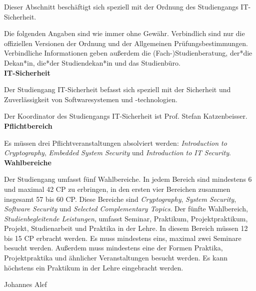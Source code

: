 {Dieser Abschnitt beschäftigt sich speziell mit der Ordnung des Studiengangs IT-Sicherheit.
}{
    Die folgenden Angaben sind wie immer ohne Gewähr. Verbindlich sind nur die offiziellen Versionen der Ordnung und der Allgemeinen Prüfungsbestimmungen. Verbindliche Informationen geben außerdem die (Fach-)Studienberatung, der*die Dekan*in, die*der Studiendekan*in und das Studienbüro.\\

    \noindent\textbf{IT-Sicherheit}

    Der Studiengang IT-Sicherheit befasst sich speziell mit der Sicherheit und Zuverlässigkeit von Softwaresystemen und -technologien.

    Der Koordinator des Studiengangs IT-Sicherheit ist Prof. Stefan Katzenbeisser.\\

    \noindent\textbf{Pflichtbereich}

    Es müssen drei Pflichtveranstaltungen absolviert werden: \textit{Introduction to Cryptography}, \textit{Embedded System Security} und \textit{Introduction to IT Security}.\\

    \noindent\textbf{Wahlbereiche}

    Der Studiengang umfasst fünf Wahlbereiche. In jedem Bereich sind mindestens 6 und maximal 42 CP zu erbringen, in den ersten vier Bereichen zusammen insgesamt 57 bis 60 CP. Diese Bereiche sind \textit{Cryptography}, \textit{System Security}, \textit{Software Security} und \textit{Selected Complementary Topics}. Der fünfte Wahlbereich, \textit{Studienbegleitende Leistungen}, umfasst Seminar, Praktikum, Projektpraktikum, Projekt, Studienarbeit und Praktika in der Lehre. In diesem Bereich müssen 12 bis 15 CP erbracht werden. Es muss mindestens eins, maximal zwei Seminare besucht werden. Außerdem muss mindestens eine der Formen Praktika, Projektpraktika und ähnlicher Veranstaltungen besucht werden. Es kann höchstens ein Praktikum in der Lehre eingebracht werden.\\

}
{Johannes Alef}
